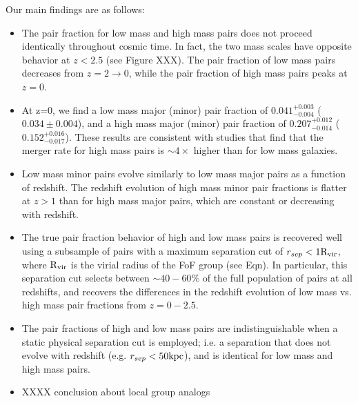 \documentclass[twocolumn]{aastex631}
\newcommand{\Rvir}{\ensuremath{\rm R_{vir}}}
\begin{document}
Our main findings are as follows:
\begin{itemize}
    \item The pair fraction for low mass and high mass pairs does not proceed identically throughout cosmic time. 
    In fact, the two mass scales have opposite behavior at $z<2.5$ (see Figure XXX). 
    The pair fraction of low mass pairs decreases from $z=2\to0$, while the pair fraction of high mass pairs peaks at $z=0$.
    \item At z=0, we find a low mass major (minor) pair fraction of $0.041^{+0.003}_{-0.004}$ ($0.034\pm0.004$), and a high mass major (minor) pair fraction of $0.207^{+0.012}_{-0.014}$ ($0.152^{+0.016}_{-0.017}$). 
    These results are consistent with studies that find that the merger rate for high mass pairs is $\sim4\times$ higher than for low mass galaxies. 
    \item Low mass minor pairs evolve similarly to low mass major pairs as a function of redshift.
    The redshift evolution of 
    high mass minor pair fractions 
    is flatter %
    at $z>1$ than for high mass major pairs, which are constant or decreasing with redshift.
    \item The true pair fraction behavior of high and low mass pairs is recovered well using a subsample of pairs with a maximum separation cut of $r_{sep}<1\Rvir$, where $\Rvir$ is the 
    virial radius of the FoF group (see Eqn). %
    In particular, this separation cut selects between $\sim40-60\%$ of the full population of pairs at all redshifts, and recovers the differences in the redshift evolution of low mass vs. high mass pair fractions from $z=0-2.5$.   %
    \item The pair fractions of high and low mass pairs are 
    indistinguishable when a static physical separation cut is employed; i.e. a separation that does not evolve with redshift (e.g. $r_{sep}<50\mathrm{kpc}$), and is identical for low mass and high mass pairs. %
    \item  XXXX conclusion about local group analogs 
\end{itemize}
\end{document}
